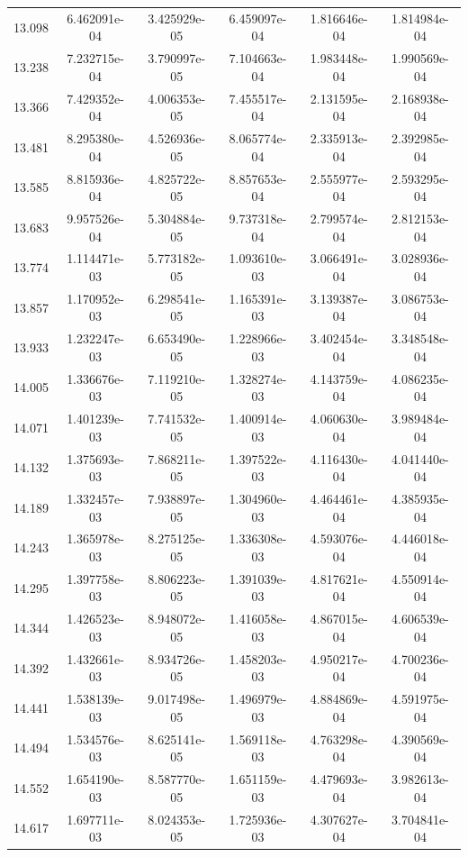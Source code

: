 \documentclass[fleqn,usenatbib]{mnras}
\begin{document}
\begin{table}
\begin{tabular}{c|cc|ccc}
13.098 & 6.462091e-04 & 3.425929e-05 & 6.459097e-04 & 1.816646e-04 & 1.814984e-04 \\
13.238 & 7.232715e-04 & 3.790997e-05 & 7.104663e-04 & 1.983448e-04 & 1.990569e-04 \\ \hline
13.366 & 7.429352e-04 & 4.006353e-05 & 7.455517e-04 & 2.131595e-04 & 2.168938e-04 \\
13.481 & 8.295380e-04 & 4.526936e-05 & 8.065774e-04 & 2.335913e-04 & 2.392985e-04 \\
13.585 & 8.815936e-04 & 4.825722e-05 & 8.857653e-04 & 2.555977e-04 & 2.593295e-04 \\
13.683 & 9.957526e-04 & 5.304884e-05 & 9.737318e-04 & 2.799574e-04 & 2.812153e-04 \\
13.774 & 1.114471e-03 & 5.773182e-05 & 1.093610e-03 & 3.066491e-04 & 3.028936e-04 \\ \hline
13.857 & 1.170952e-03 & 6.298541e-05 & 1.165391e-03 & 3.139387e-04 & 3.086753e-04 \\
13.933 & 1.232247e-03 & 6.653490e-05 & 1.228966e-03 & 3.402454e-04 & 3.348548e-04 \\
14.005 & 1.336676e-03 & 7.119210e-05 & 1.328274e-03 & 4.143759e-04 & 4.086235e-04 \\
14.071 & 1.401239e-03 & 7.741532e-05 & 1.400914e-03 & 4.060630e-04 & 3.989484e-04 \\
14.132 & 1.375693e-03 & 7.868211e-05 & 1.397522e-03 & 4.116430e-04 & 4.041440e-04 \\ \hline
14.189 & 1.332457e-03 & 7.938897e-05 & 1.304960e-03 & 4.464461e-04 & 4.385935e-04 \\
14.243 & 1.365978e-03 & 8.275125e-05 & 1.336308e-03 & 4.593076e-04 & 4.446018e-04 \\
14.295 & 1.397758e-03 & 8.806223e-05 & 1.391039e-03 & 4.817621e-04 & 4.550914e-04 \\
14.344 & 1.426523e-03 & 8.948072e-05 & 1.416058e-03 & 4.867015e-04 & 4.606539e-04 \\
14.392 & 1.432661e-03 & 8.934726e-05 & 1.458203e-03 & 4.950217e-04 & 4.700236e-04 \\ \hline
14.441 & 1.538139e-03 & 9.017498e-05 & 1.496979e-03 & 4.884869e-04 & 4.591975e-04 \\
14.494 & 1.534576e-03 & 8.625141e-05 & 1.569118e-03 & 4.763298e-04 & 4.390569e-04 \\
14.552 & 1.654190e-03 & 8.587770e-05 & 1.651159e-03 & 4.479693e-04 & 3.982613e-04 \\
14.617 & 1.697711e-03 & 8.024353e-05 & 1.725936e-03 & 4.307627e-04 & 3.704841e-04 \\

\end{tabular}
\end{table}
\end{document}
